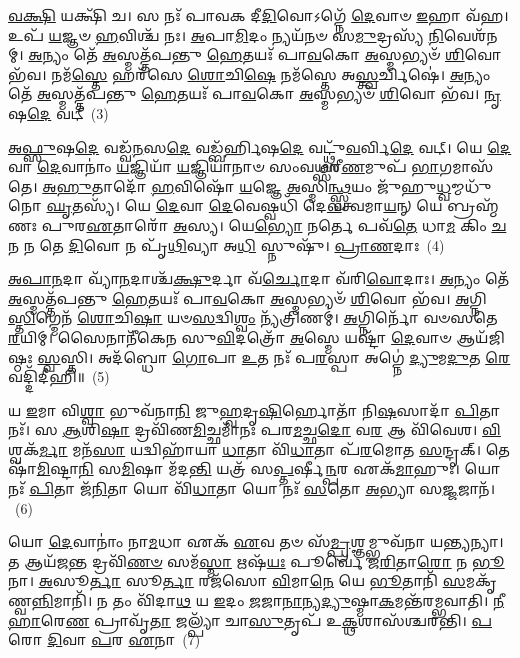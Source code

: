 \-\ul{𑌵}\-\-\ul{𑌕𑍍𑌷𑌿} 𑌯𑌕𑍍𑌷𑌿᳴ 𑌚। 𑌸 𑌨𑌃᳴ 𑌪𑌾𑌵𑌕 𑌦𑍀\-\ul{𑌦𑌿}\-𑌵𑍋\-𑌽𑌗𑍍𑌨𑍇᳴ \ul{𑌦𑍇}\-𑌵𑌾𑍞 \ul{𑌇}\-𑌹𑌾 𑌵᳴𑌹। 𑌉𑌪᳴ \ul{𑌯}\-𑌜𑍍𑌞𑍞 \ul{𑌹}\-𑌵𑌿𑌶𑍍𑌚᳴ 𑌨𑌃। \ul{𑌅}\-𑌪𑌾\-\ul{𑌮𑌿}\-𑌦𑌂 𑌨𑍍𑌯𑌯᳴𑌨𑍞 𑌸\-\ul{𑌮𑍁}\-𑌦𑍍𑌰𑌸𑍍𑌯᳴ \ul{𑌨𑌿}\-𑌵𑍇𑌶᳴𑌨𑌮𑍍। \ul{𑌅}\-𑌨𑍍𑌯𑌂 𑌤𑍇᳴ \ul{𑌅}\-𑌸𑍍𑌮𑌤𑍍𑌤᳴𑌪𑌨𑍍𑌤𑍁 \ul{𑌹𑍇}\-𑌤𑌯𑌃᳴ 𑌪𑌾\-\ul{𑌵}\-𑌕𑍋 \ul{𑌅}\-𑌸𑍍𑌮𑌭𑍍𑌯𑍞᳴ \ul{𑌶𑌿}\-𑌵𑍋 𑌭᳴𑌵। 𑌨𑌮᳴\-\ul{𑌸𑍍𑌤𑍇} 𑌹𑌰᳴𑌸𑍇 \ul{𑌶𑍋}\-𑌚𑌿\-\ul{𑌷𑍇} 𑌨𑌮᳴𑌸𑍍𑌤𑍇 𑌅\-\ul{𑌸𑍍𑌤𑍍𑌵}\-𑌰𑍍𑌚𑌿𑌷𑍇॑। \ul{𑌅}\-𑌨𑍍𑌯𑌂 𑌤𑍇᳴ \ul{𑌅}\-𑌸𑍍𑌮𑌤𑍍𑌤᳴𑌪𑌨𑍍𑌤𑍁 \ul{𑌹𑍇}\-𑌤𑌯𑌃᳴ 𑌪𑌾\-\ul{𑌵}\-𑌕𑍋 \ul{𑌅}\-𑌸𑍍𑌮𑌭𑍍𑌯𑍞᳴ \ul{𑌶𑌿}\-𑌵𑍋 𑌭᳴𑌵। \ul{𑌨𑍃}\-𑌷\-\ul{𑌦𑍇} 𑌵𑌟𑍍~(3)

\-\ul{𑌅}\-\-\ul{𑌫𑍍𑌸𑍁}\-𑌷\-\ul{𑌦𑍇} 𑌵𑌡𑍍𑌵᳴\-\ul{𑌨}\-𑌸\-\ul{𑌦𑍇} 𑌵𑌡𑍍𑌬᳴𑌰𑍍\mbox{}\-\ul{𑌹𑌿}\-𑌷\-\ul{𑌦𑍇} 𑌵𑌟𑍍𑌥𑍍𑌸𑍁᳴\-\ul{𑌵}\-𑌰𑍍𑌵𑌿\-\ul{𑌦𑍇} 𑌵𑌟𑍍। 𑌯𑍇 \ul{𑌦𑍇}\-𑌵𑌾 \ul{𑌦𑍇}\-𑌵𑌾𑌨𑌾𑌂॑ \ul{𑌯}\-𑌜𑍍𑌞𑌿𑌯𑌾᳴ \ul{𑌯}\-𑌜𑍍𑌞𑌿𑌯𑌾᳴𑌨𑌾𑍞 𑌸𑌂𑌵\-\ul{𑌥𑍍𑌸}\-𑌰𑍀\-\ul{𑌣}\-𑌮𑍁𑌪᳴ \ul{𑌭𑌾}\-𑌗𑌮𑌾𑌸᳴𑌤𑍇। \ul{𑌅}\-\-\ul{𑌹𑍁}\-𑌤𑌾𑌦𑍋᳴ \ul{𑌹}\-𑌵𑌿𑌷𑍋᳴ \ul{𑌯}\-𑌜𑍍𑌞𑍇 \ul{𑌅}\-𑌸𑍍𑌮𑌿\-\ul{𑌨𑍍𑌥𑍍𑌸𑍍𑌵}\-𑌯𑌂 𑌜𑍁᳴𑌹𑍁\-\ul{𑌧𑍍𑌵}\-𑌮𑍍𑌮𑌧𑍁᳴𑌨𑍋 \ul{𑌘𑍃}\-𑌤𑌸𑍍𑌯᳴। 𑌯𑍇 \ul{𑌦𑍇}\-𑌵𑌾 \ul{𑌦𑍇}\-𑌵𑍇𑌷𑍍𑌵𑌧𑌿᳴ 𑌦𑍇\-\ul{𑌵}\-𑌤𑍍𑌵𑌮𑌾\-\ul{𑌯}\-𑌨𑍍 𑌯𑍇 𑌬𑍍𑌰𑌹𑍍𑌮᳴𑌣𑌃 𑌪𑍁𑌰\-\ul{𑌏}\-𑌤𑌾𑌰𑍋᳴ \ul{𑌅}\-𑌸𑍍𑌯। 𑌯𑍇\-\ul{𑌭𑍍𑌯𑍋} 𑌨𑌰𑍍𑌤𑍇 𑌪𑌵᳴\-\ul{𑌤𑍇} 𑌧𑌾\-\ul{𑌮} 𑌕𑌿𑌂 \ul{𑌚}\-𑌨 𑌨 𑌤𑍇 \ul{𑌦𑌿}\-𑌵𑍋 𑌨 𑌪𑍃᳴\-\ul{𑌥𑌿}\-𑌵𑍍𑌯𑌾 𑌅\-\ul{𑌧𑌿} 𑌸𑍍𑌨𑍁𑌷𑍁᳴। \ul{𑌪𑍍𑌰𑌾}\-\-\ul{𑌣}\-𑌦𑌾𑌃~(4)

\-\ul{𑌅}\-\-\ul{𑌪𑌾}\-\-\ul{𑌨}\-𑌦𑌾 𑌵𑍍𑌯𑌾᳴\-\ul{𑌨}\-𑌦𑌾𑌶𑍍𑌚᳴\-\ul{𑌕𑍍𑌷𑍁}\-𑌰𑍍𑌦𑌾 𑌵᳴\-\ul{𑌰𑍍𑌚𑍋}\-𑌦𑌾 𑌵᳴𑌰𑌿\-\ul{𑌵𑍋}\-𑌦𑌾𑌃। \ul{𑌅}\-𑌨𑍍𑌯𑌂 𑌤𑍇᳴ \ul{𑌅}\-𑌸𑍍𑌮𑌤𑍍𑌤᳴𑌪𑌨𑍍𑌤𑍁 \ul{𑌹𑍇}\-𑌤𑌯𑌃᳴ 𑌪𑌾\-\ul{𑌵}\-𑌕𑍋 \ul{𑌅}\-𑌸𑍍𑌮𑌭𑍍𑌯𑍞᳴ \ul{𑌶𑌿}\-𑌵𑍋 𑌭᳴𑌵। \ul{𑌅}\-𑌗𑍍𑌨𑌿\-\ul{𑌸𑍍𑌤𑌿}\-𑌗𑍍𑌮𑍇𑌨᳴ \ul{𑌶𑍋}\-𑌚𑌿\-\ul{𑌷𑌾} 𑌯𑍞\-\ul{𑌸}\-𑌦𑍍𑌵𑌿\-\ul{𑌶𑍍𑌵𑌂} 𑌨𑍍𑌯᳴𑌤𑍍𑌰𑌿𑌣𑌮𑍍॑। \ul{𑌅}\-𑌗𑍍𑌨𑌿𑌰𑍍𑌨𑍋᳴ 𑌵𑍞𑌸𑌤𑍇 \ul{𑌰}\-𑌯𑌿𑌮𑍍। 𑌸𑍈𑌨𑌾𑌨𑍀᳴𑌕𑍇𑌨 𑌸𑍁\-\ul{𑌵𑌿}\-𑌦𑌤𑍍𑌰𑍋᳴ \ul{𑌅}\-𑌸𑍍𑌮𑍇 𑌯𑌷𑍍𑌟𑌾᳴ \ul{𑌦𑍇}\-𑌵𑌾𑍞 𑌆𑌯᳴𑌜𑌿𑌷𑍍𑌠𑌃 \ul{𑌸𑍍𑌵}\-𑌸𑍍𑌤𑌿। 𑌅𑌦᳴𑌬𑍍𑌧𑍋 \ul{𑌗𑍋}\-𑌪𑌾 \ul{𑌉}\-𑌤 𑌨𑌃᳴ 𑌪\-\ul{𑌰}\-𑌸𑍍𑌪𑌾 𑌅𑌗𑍍𑌨𑍇॑ \ul{𑌦𑍍𑌯𑍁}\-𑌮\-\ul{𑌦𑍁}\-𑌤 \ul{𑌰𑍇}\-𑌵𑌦𑍍𑌦𑌿᳴𑌦𑍀𑌹𑌿॥~(5)

{\anuvakamend[{𑌉𑌪᳴ \ul{𑌦𑍇}\-𑌵𑌾𑌨𑍍 𑌵𑌟𑍍𑌪𑍍𑌰𑌾᳴\-\ul{𑌣}\-𑌦𑌾𑌶𑍍𑌚𑌤𑍁᳴𑌶𑍍𑌚𑌤𑍍𑌵𑌾𑌰𑌿𑍞𑌶𑌚𑍍𑌚}]}%

𑌯 \ul{𑌇}\-𑌮𑌾 𑌵𑌿\-\ul{𑌶𑍍𑌵𑌾} 𑌭𑍁𑌵᳴𑌨𑌾\-\ul{𑌨𑌿} 𑌜𑍁\-\ul{𑌹𑍍𑌵}\-𑌦𑍃\-\ul{𑌷𑌿}\-𑌰𑍍\mbox{}𑌹𑍋𑌤𑌾᳴ 𑌨𑌿\-\ul{𑌷}\-𑌸𑌾𑌦𑌾᳴ \ul{𑌪𑌿}\-𑌤𑌾 𑌨𑌃᳴। 𑌸 \ul{𑌆}\-𑌶𑌿\-\ul{𑌷𑌾} 𑌦𑍍𑌰𑌵𑌿᳴𑌣\-\ul{𑌮𑌿}\-𑌚𑍍𑌛𑌮𑌾᳴𑌨𑌃 𑌪𑌰\-\ul{𑌮}\-𑌚𑍍𑌛\-\ul{𑌦𑍋} 𑌵\-\ul{𑌰} 𑌆 𑌵𑌿᳴𑌵𑍇𑌶। \ul{𑌵𑌿}\-𑌶𑍍𑌵𑌕᳴\-\ul{𑌰𑍍𑌮𑌾} 𑌮𑌨᳴\-\ul{𑌸𑌾} 𑌯𑌦𑍍𑌵𑌿𑌹𑌾᳴𑌯𑌾 \ul{𑌧𑌾}\-𑌤𑌾 𑌵𑌿᳴\-\ul{𑌧𑌾}\-𑌤𑌾 𑌪᳴\-\ul{𑌰}\-𑌮𑍋𑌤 \ul{𑌸}\-𑌨𑍍𑌦𑍃𑌕𑍍। 𑌤𑍇𑌷𑌾᳴\-\ul{𑌮𑌿}\-𑌷𑍍𑌟𑌾\-\ul{𑌨𑌿} 𑌸\-\ul{𑌮𑌿}\-𑌷𑌾 𑌮᳴𑌦\-\ul{𑌨𑍍𑌤𑌿} 𑌯𑌤𑍍𑌰᳴ 𑌸\-\ul{𑌪𑍍𑌤}\-𑌰𑍍\mbox{}𑌷𑍀\-\ul{𑌨𑍍𑌪}\-𑌰 𑌏𑌕᳴\-\ul{𑌮𑌾}\-𑌹𑍁𑌃। 𑌯𑍋 𑌨𑌃᳴ \ul{𑌪𑌿}\-𑌤𑌾 𑌜᳴\-\ul{𑌨𑌿}\-𑌤𑌾 𑌯𑍋 𑌵𑌿᳴\-\ul{𑌧𑌾}\-𑌤𑌾 𑌯𑍋 𑌨𑌃᳴ \ul{𑌸}\-𑌤𑍋 \ul{𑌅}\-𑌭𑍍𑌯𑌾 𑌸\-\ul{𑌜𑍍𑌜}\-𑌜𑌾𑌨᳴।~(6)

𑌯𑍋 \ul{𑌦𑍇}\-𑌵𑌾𑌨𑌾𑌂॑ 𑌨𑌾\-\ul{𑌮}\-𑌧𑌾 𑌏𑌕᳴ \ul{𑌏}\-𑌵 𑌤𑍞 𑌸᳴\-\ul{𑌮𑍍𑌪𑍍𑌰}\-𑌶𑍍𑌞𑌮𑍍𑌭𑍁𑌵᳴𑌨𑌾 𑌯\-\ul{𑌨𑍍𑌤𑍍𑌯}\-𑌨𑍍𑌯𑌾। 𑌤 𑌆𑌯᳴𑌜\-\ul{𑌨𑍍𑌤} 𑌦𑍍𑌰𑌵𑌿᳴\-\ul{𑌣}\-\-\ul{𑍞} 𑌸𑌮᳴\-\ul{𑌸𑍍𑌮𑌾} 𑌋𑌷᳴\-\ul{𑌯𑌃} 𑌪𑍂𑌰𑍍𑌵𑍇᳴ 𑌜\-\ul{𑌰𑌿}\-𑌤𑌾\-\ul{𑌰𑍋} 𑌨 \ul{𑌭𑍂}\-𑌨𑌾। \ul{𑌅}\-𑌸𑍂\-\ul{𑌰𑍍𑌤𑌾} 𑌸𑍂\-\ul{𑌰𑍍𑌤𑌾} 𑌰𑌜᳴𑌸𑍋 \ul{𑌵𑌿}\-𑌮𑌾\-\ul{𑌨𑍇} 𑌯𑍇 \ul{𑌭𑍂}\-𑌤𑌾𑌨𑌿᳴ \ul{𑌸}\-𑌮𑌕𑍃᳴𑌣𑍍𑌵\-\ul{𑌨𑍍𑌨𑌿}\-𑌮𑌾𑌨𑌿᳴। 𑌨 𑌤𑌂 𑌵𑌿᳴𑌦𑌾\-\ul{𑌥} 𑌯 \ul{𑌇}\-𑌦𑌂 \ul{𑌜}\-𑌜𑌾\-\ul{𑌨𑌾}\-𑌨𑍍𑌯\-\ul{𑌦𑍍𑌯𑍁}\-𑌷𑍍𑌮𑌾\-\ul{𑌕}\-𑌮𑌨𑍍𑌤᳴𑌰𑌮𑍍𑌭𑌵𑌾𑌤𑌿। \ul{𑌨𑍀}\-\-\ul{𑌹𑌾}\-𑌰𑍇\-\ul{𑌣} 𑌪𑍍𑌰𑌾𑌵𑍃᳴\-\ul{𑌤𑌾} 𑌜𑌲𑍍𑌪𑍍𑌯𑌾᳴ 𑌚𑌾\-\ul{𑌸𑍁}\-𑌤𑍃𑌪᳴ 𑌉\-\ul{𑌕𑍍𑌥}\-𑌶𑌾𑌸᳴𑌶𑍍𑌚𑌰𑌨𑍍𑌤𑌿। \ul{𑌪}\-𑌰𑍋 \ul{𑌦𑌿}\-𑌵𑌾 \ul{𑌪}\-𑌰 \ul{𑌏}\-𑌨𑌾~(7)


